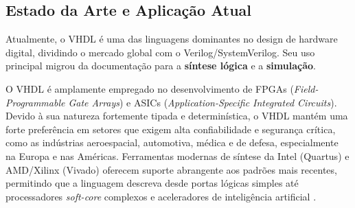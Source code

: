 \subsection{Estado da Arte e Aplicação Atual}
Atualmente, o VHDL é uma das linguagens dominantes no design de hardware digital, dividindo o mercado global com o Verilog/SystemVerilog. Seu uso principal migrou da documentação para a \textbf{síntese lógica} e a \textbf{simulação}.

O VHDL é amplamente empregado no desenvolvimento de FPGAs (\textit{Field-Programmable Gate Arrays}) e ASICs (\textit{Application-Specific Integrated Circuits}). Devido à sua natureza fortemente tipada e determinística, o VHDL mantém uma forte preferência em setores que exigem alta confiabilidade e segurança crítica, como as indústrias aeroespacial, automotiva, médica e de defesa, especialmente na Europa e nas Américas. Ferramentas modernas de síntese da Intel (Quartus) e AMD/Xilinx (Vivado) oferecem suporte abrangente aos padrões mais recentes, permitindo que a linguagem descreva desde portas lógicas simples até processadores \textit{soft-core} complexos e aceleradores de inteligência artificial \cite{chu2008fpga,doulosVhdlHistory}.
